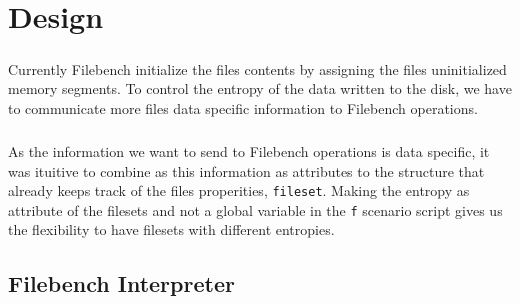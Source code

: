 \chapter{Design}\label{chap:des}

\paragraph{}
Currently Filebench initialize the files contents by assigning the files uninitialized memory segments.
 To control the entropy of the data written to the disk, we have to communicate more files data specific information to Filebench operations.

\paragraph{}
As the information we want to send to Filebench operations is data specific, it was ituitive to combine as this information as attributes to the structure that already keeps track of the files properities, \verb+fileset+.
Making the entropy as attribute of the filesets and not a global variable in the \verb+f+ scenario script gives us the flexibility to have filesets with different entropies.




\section{Filebench Interpreter}

